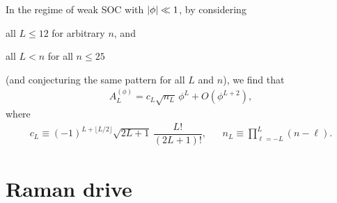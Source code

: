 \documentclass[nofootinbib,notitlepage,11pt]{revtex4-2}
\newcommand{\f}[2]{\dfrac{#1}{#2}} %
\newcommand{\p}[1]{\left(#1\right)} %
\newcommand{\1}{\mathds{1}}
\begin{document}
In the regime of weak SOC with $\abs{\phi}\ll1$, by considering
\begin{enumerate*}
\item all $L\le12$ for arbitrary $n$, and
\item all $L<n$ for all $n\le25$
\end{enumerate*}
(and conjecturing the same pattern for all $L$ and $n$), we find that
\begin{align}
  A_L^{(\phi)} = c_L \sqrt{n_L}\, \phi^L + O\p{\phi^{L+2}},
  \label{eq:A_L_phi_small}
\end{align}
where
\begin{align}
  c_L \equiv \p{-1}^{L+\lfloor L/2\rfloor}
  \sqrt{2L+1}\, \f{L!}{\p{2L+1}!},
  &&
  n_L \equiv \prod_{\ell=-L}^L\p{n-\ell}.
\end{align}

\section{Raman drive}
\label{sec:drive_raman}
\end{document}
